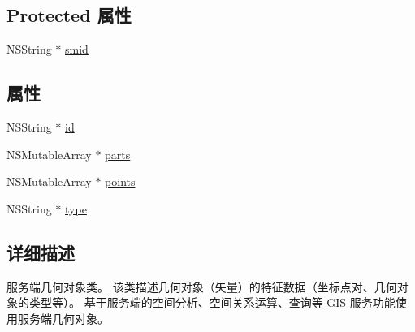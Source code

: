 \subsection*{Protected 属性}
\begin{DoxyCompactItemize}
\item 
N\-S\-String $\ast$ \hyperlink{interface_server_geometry_a388397cabb004ee3438947fb3d98e9d4}{smid}
\end{DoxyCompactItemize}
\subsection*{属性}
\begin{DoxyCompactItemize}
\item 
N\-S\-String $\ast$ \hyperlink{interface_server_geometry_aeaf1259147fdbd921ffd3fbb2cad2042}{id}
\item 
N\-S\-Mutable\-Array $\ast$ \hyperlink{interface_server_geometry_a3f8f113f0b46713c25d6b1aa15a52d86}{parts}
\item 
N\-S\-Mutable\-Array $\ast$ \hyperlink{interface_server_geometry_a8570da749c6442e61ef55b7966a5befb}{points}
\item 
N\-S\-String $\ast$ \hyperlink{interface_server_geometry_a362e7ec6a642117e172be2437a40ede5}{type}
\end{DoxyCompactItemize}


\subsection{详细描述}
服务端几何对象类。 该类描述几何对象（矢量）的特征数据（坐标点对、几何对象的类型等）。 基于服务端的空间分析、空间关系运算、查询等 G\-I\-S 服务功能使用服务端几何对象。 

